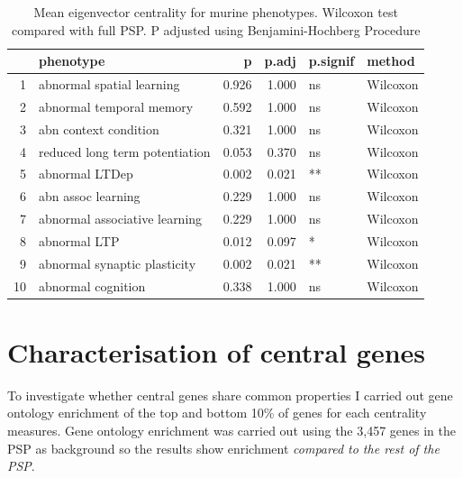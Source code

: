 \begin{table}[ht]
\centering
\begin{tabular}{rlrrll}
  \toprule
 & phenotype & p & p.adj & p.signif & method \\ 
  \midrule
1 & abnormal spatial learning & 0.926 & 1.000 & ns & Wilcoxon \\ 
  2 & abnormal temporal memory & 0.592 & 1.000 & ns & Wilcoxon \\ 
  3 & abn context condition & 0.321 & 1.000 & ns & Wilcoxon \\ 
  4 & reduced long term potentiation & 0.053 & 0.370 & ns & Wilcoxon \\ 
  5 & abnormal LTDep & 0.002 & 0.021 & ** & Wilcoxon \\ 
  6 & abn assoc learning & 0.229 & 1.000 & ns & Wilcoxon \\ 
  7 & abnormal associative learning & 0.229 & 1.000 & ns & Wilcoxon \\ 
  8 & abnormal LTP & 0.012 & 0.097 & * & Wilcoxon \\ 
  9 & abnormal synaptic plasticity & 0.002 & 0.021 & ** & Wilcoxon \\ 
  10 & abnormal cognition & 0.338 & 1.000 & ns & Wilcoxon \\ 
   \bottomrule
\end{tabular}
\caption{Mean eigenvector centrality for murine phenotypes. Wilcoxon test compared with full PSP. P adjusted using Benjamini-Hochberg Procedure} 
\label{tab:eigencentrality murine phenotypes. Wilcoxon test compared with full PSP}
\end{table}


\clearpage



\section{Characterisation of central genes}

To investigate whether central genes share common properties I carried out gene ontology enrichment of the top and bottom 10\% of genes for each centrality measures. Gene ontology enrichment was carried out using the 3,457 genes in the PSP as background so the results show enrichment \textit{compared to the rest of the PSP}. 


